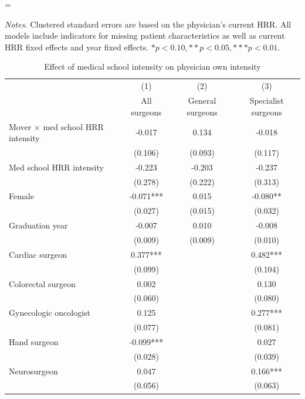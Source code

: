 \setlength{\LTpost}{0mm}
\LTcapwidth=\textwidth
\begin{ThreePartTable}
\begin{TableNotes}
    \textit{Notes.} Clustered standard errors are based on the physician's current HRR. All models include indicators for missing patient characteristics as well as current HRR fixed effects and year fixed effects. $* p < 0.10, ** p < 0.05, *** p < 0.01$.
\end{TableNotes}
\begin{longtable}{lccc}
    \label{tab:res-main} \\
    \caption{Effect of medical school intensity on physician own intensity} \\
        \toprule
         & (1) & (2) & (3) \\
         & All surgeons & General surgeons & Specialist surgeons \\
        \midrule
        Mover $\times$ med school HRR intensity & -0.017 & 0.134 & -0.018 \\ 
         & (0.106) & (0.093) & (0.117) \\ 
        Med school HRR intensity & -0.223 & -0.203 & -0.237 \\ 
         & (0.278) & (0.222) & (0.313) \\ 
        Female & -0.071*** & 0.015 & -0.080** \\ 
         & (0.027) & (0.015) & (0.032) \\ 
        Graduation year & -0.007 & 0.010 & -0.008 \\ 
         & (0.009) & (0.009) & (0.010) \\ 
        Cardiac surgeon & 0.377*** &  & 0.482*** \\ 
         & (0.099) &  & (0.104) \\ 
        Colorectal surgeon & 0.002 &  & 0.130 \\ 
         & (0.060) &  & (0.080) \\ 
        Gynecologic oncologist & 0.125 &  & 0.277*** \\ 
         & (0.077) &  & (0.081) \\ 
        Hand surgeon & -0.099*** &  & 0.027 \\ 
         & (0.028) &  & (0.039) \\ 
        Neurosurgeon & 0.047 &  & 0.166*** \\ 
         & (0.056) &  & (0.063) \\ 

\end{longtable}
\end{ThreePartTable}
